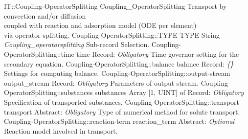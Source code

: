 \begin{RecordType}
	{IT::Coupling-OperatorSplitting}
	{Coupling{\_}OperatorSplitting}
	{} %
	{} %
	{{{Transport by convection and/or diffusion}\\{
coupled with reaction and adsorption model (ODE per element)}\\{
 via operator splitting.}}}
		\RecKey
			{Coupling-OperatorSplitting::TYPE}
			{TYPE}
			{{String}}
			{ \it{Coupling{\_}operatorsplitting} }
			{{{Sub-record Selection.}}}
		\RecKey
			{Coupling-OperatorSplitting::time}
			{time}
			{{Record}{: }}
			{ \it{Obligatory} }
			{{{Time governor setting for the secondary equation.}}}
		\RecKey
			{Coupling-OperatorSplitting::balance}
			{balance}
			{{Record}{: }}
			{ \it{{\{}{\}}} }
			{{{Settings for computing balance.}}}
		\RecKey
			{Coupling-OperatorSplitting::output-stream}
			{output{\_}stream}
			{{Record}{: }}
			{ \it{Obligatory} }
			{{{Parameters of output stream.}}}
		\RecKey
			{Coupling-OperatorSplitting::substances}
			{substances}
			{{Array [1, UINT] of }{Record}{: }}
			{ \it{Obligatory} }
			{{{Specification of transported substances.}}}
		\RecKey
			{Coupling-OperatorSplitting::transport}
			{transport}
			{{Abstract}{: }}
			{ \it{Obligatory} }
			{{{Type of numerical method for solute transport.}}}
		\RecKey
			{Coupling-OperatorSplitting::reaction-term}
			{reaction{\_}term}
			{{Abstract}{: }}
			{ \it{Optional} }
			{{{Reaction model involved in transport.}}}
\end{RecordType}
